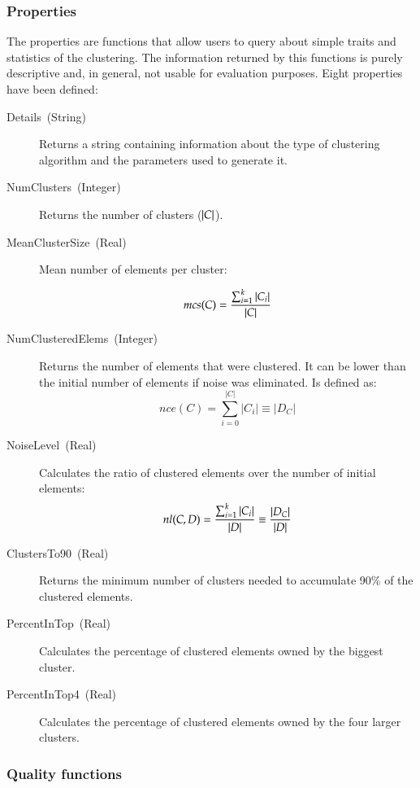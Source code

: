 \subsubsection{Properties}

The properties are functions that allow users to query about simple
traits and statistics of the clustering. The information returned
by this functions is purely descriptive and, in general, not usable
for evaluation purposes. Eight properties have been defined:

\begin{description}
\item [{Details~(String)}] Returns a string containing information about
the type of clustering algorithm and the parameters used to generate
it. 
\item [{NumClusters~(Integer)}] Returns the number of clusters ($\lvert C\rvert$). 
\item [{MeanClusterSize~(Real)}] Mean number of elements per cluster:

\begin{equation}
mcs(C)=\frac{\sum_{i=1}^{k}|C_{i}|}{\lvert C\rvert}
\end{equation}

\item [{NumClusteredElems~(Integer)}] Returns the number of elements that
were clustered. It can be lower than the initial number of elements
if noise was eliminated. Is defined as:
\begin{equation}
nce(C)=\sum_{i=0}^{|C|}|C_{i}|\equiv|D_{C}|
\end{equation}

\item [{NoiseLevel~(Real)}] Calculates the ratio of clustered elements
over the number of initial elements:
\begin{equation}
nl(C,D)=\frac{\sum_{i=1}^{k}|C_{i}|}{\lvert D\rvert}\equiv\frac{|D_{C}|}{|D|}
\end{equation}

\item [{ClustersTo90~(Real)}] Returns the minimum number of clusters needed
to accumulate 90\% of the clustered elements. 
\item [{PercentInTop~(Real)}] Calculates the percentage of clustered elements
owned by the biggest cluster. 
\item [{PercentInTop4~(Real)}] Calculates the percentage of clustered
elements owned by the four larger clusters.
\end{description}

\subsubsection{Quality functions }

